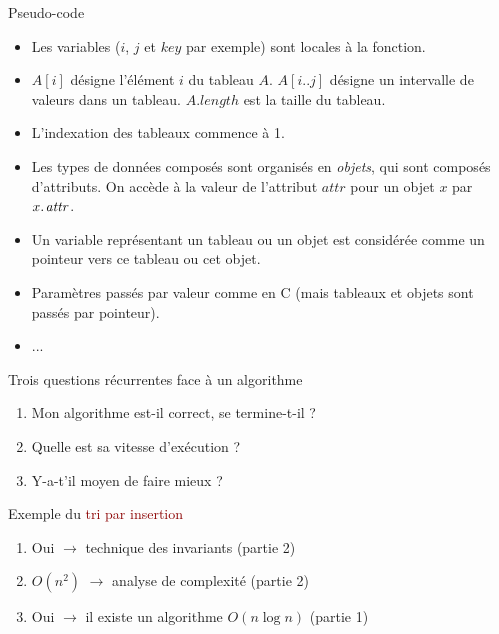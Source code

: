 \begin{frame}{Pseudo-code}

\begin{itemize}
\item Les variables ($i$, $j$ et $key$ par exemple) sont locales à la fonction.
\item $A[i]$ désigne l'élément $i$ du tableau $A$. $A[i..j]$ désigne
  un intervalle de valeurs dans un tableau. $A.length$ est la taille du tableau.
\item L'indexation des tableaux commence à 1.
\item Les types de données composés sont organisés en {\it objets}, qui sont composés d'attributs. On accède à la valeur de l'attribut $attr$ pour un objet $x$ par $\attrib{x}{attr}$.
\item Un variable représentant un tableau ou un objet est considérée comme un pointeur vers ce tableau ou cet objet. 
\item Paramètres passés par valeur comme en C (mais tableaux et objets sont passés par pointeur).
\item ...
\end{itemize}
\end{frame}

\begin{frame}{Trois questions récurrentes face à un algorithme}

\begin{enumerate}
\item Mon algorithme est-il correct, se termine-t-il ? %

\bigskip

\item Quelle est sa vitesse d'exécution ? %

\bigskip

\item Y-a-t'il moyen de faire mieux ? %

\end{enumerate}

\bigskip

Exemple du \textcolor{darkred}{tri par insertion}
\begin{enumerate}
\item Oui $\rightarrow$ technique des invariants (partie 2)
\item $O(n^2)$ $\rightarrow$ analyse de complexité (partie 2)
\item Oui $\rightarrow$ il existe un algorithme $O(n\log n)$ (partie 1)
\end{enumerate}

\end{frame}

